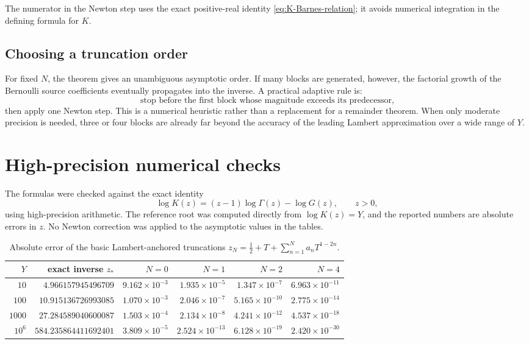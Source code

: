 \documentclass[11pt,oneside]{article}
\theoremstyle{plain}
\theoremstyle{definition}
\theoremstyle{remark}
\begin{document}
The numerator in the Newton step uses the exact positive-real identity
\cref{eq:K-Barnes-relation}; it avoids numerical integration in the defining formula
for \(K\).

\subsection{Choosing a truncation order}

For fixed \(N\), the theorem gives an unambiguous asymptotic order.  If many
blocks are generated, however, the factorial growth of the Bernoulli source
coefficients eventually propagates into the inverse.  A practical adaptive
rule is:
\begin{equation}
 \text{stop before the first block whose magnitude exceeds its predecessor,}
 \label{eq:least-block-rule}
\end{equation}
then apply one Newton step.  This is a numerical heuristic rather than a
replacement for a remainder theorem.  When only moderate precision is needed,
three or four blocks are already far beyond the accuracy of the leading
Lambert approximation over a wide range of \(Y\).

\section{High-precision numerical checks}
\label{sec:numerics}

The formulas were checked against the exact identity
\begin{equation}
 \log K(z)=(z-1)\log\Gamma(z)-\log G(z),
 \qquad z>0,
 \label{eq:logK-exact-numeric}
\end{equation}
using high-precision arithmetic.  The reference root was computed directly
from \(\log K(z)=Y\), and the reported numbers are absolute errors in \(z\).
No Newton correction was applied to the asymptotic values in the tables.

\begin{table}[htbp]
\centering
\small
\caption{Absolute error of the basic Lambert-anchored truncations
\(z_N=\tfrac12+T+\sum_{n=1}^{N}a_nT^{1-2n}\).}
\label{tab:basic-errors}
\begin{tabular}{@{}rrrrrr@{}}
\toprule
\(Y\) & exact inverse \(z_*\) & \(N=0\) & \(N=1\) & \(N=2\) & \(N=4\) \\
\midrule
\(10\)
 & \(4.966157945496709\)
 & \(9.162\times10^{-3}\) & \(1.935\times10^{-5}\)
 & \(1.347\times10^{-7}\) & \(6.963\times10^{-11}\) \\
\(100\)
 & \(10.915136726993085\)
 & \(1.070\times10^{-3}\) & \(2.046\times10^{-7}\)
 & \(5.165\times10^{-10}\) & \(2.775\times10^{-14}\) \\
\(1000\)
 & \(27.284589040600087\)
 & \(1.503\times10^{-4}\) & \(2.134\times10^{-8}\)
 & \(4.241\times10^{-12}\) & \(4.537\times10^{-18}\) \\
\(10^6\)
 & \(584.235864411692401\)
 & \(3.809\times10^{-5}\) & \(2.524\times10^{-13}\)
 & \(6.128\times10^{-19}\) & \(2.420\times10^{-30}\) \\
\bottomrule
\end{tabular}
\end{table}
\end{document}
